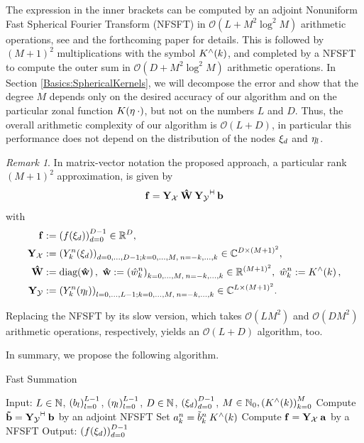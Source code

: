 \documentclass[11pt,a4paper,twoside,bibtotoc]{scrartcl}
\theoremstyle{plain}
\theoremstyle{definition}
\theoremstyle{remark}
\newtheorem{remark}[theorem]{Remark}
\newcommand{\adj}{{\vdash \hspace*{-1.72mm} \dashv}}
\numberwithin{equation}{section}
\numberwithin{table}{section}
\numberwithin{figure}{section}
\begin{document}
The expression in the inner brackets can be computed by an adjoint Nonuniform
Fast Spherical Fourier Transform (NFSFT) in $\mathcal{O}(L + M^2 \log^2 M)$
arithmetic operations, see \cite{} and the forthcoming paper \cite{} for
details.
This is followed by $(M+1)^2$ multiplications with the symbol
$K^{\wedge}{\hspace{-0.4ex}}\left(k\right)$, and completed by a NFSFT to compute the outer sum in
$\mathcal{O}(D + M^2 \log^2 M)$ arithmetic operations.
In Section \ref{Basics:SphericalKernels}, we will decompose the error and show
that the degree $M$ depends only on the desired accuracy of our algorithm and
on the particular zonal function $K{\hspace{-0.4ex}}\left(\mathbf{\eta} \: \cdot\right)$, but not on the
numbers $L$ and $D$.
Thus, the overall arithmetic complexity of our algorithm is $\mathcal{O}(L +
D)$, in particular this performance does not depend on the distribution of the
nodes $\mathbf{\xi}_{d}$ and $\mathbf{\eta}_{l}$.

\begin{remark}
In matrix-vector notation the proposed approach, a particular rank $(M+1)^2$
approximation, is given by
\[
  \V{f} = \V{Y_{\mathcal{X}}} \: \V{\hat W} \:
  \V{Y_{\mathcal{Y}}}^{\adj} \: \V{b}
\]
with
\begin{align}
  \nonumber
  \mathbf{f} & := \left(f{\hspace{-0.4ex}}\left(\mathbf{\xi}_{d}\right)\right)_{d=0}^{D-1} \in \mathbb{R}^D,
  \\ \nonumber
  \mathbf{Y_{\mathcal{X}}} & := \left(Y_k^n{\hspace{-0.4ex}}\left(\mathbf{\xi}_{d}\right)\right)_{d=0,\ldots,D-1;
  k=0,\ldots,M,\:n=-k,\ldots,k} \in \mathbb{C}^{D \times
  \left(M+1\right)^2}, \\ \nonumber
  \mathbf{\hat W} & := \text{\rm{diag}}{\hspace{-0.4ex}}\left(\mathbf{\hat w}\right),\ \mathbf{\hat w} := \left(\hat
  w_{k}^{n}\right)_{k=0,\ldots,M,\:n=-k,\ldots,k} \in \mathbb{R}^{(M+1)^2},\ \hat w_{k}^n :=
  K^{\wedge}{\hspace{-0.4ex}}\left(k\right), \\ \nonumber
  \mathbf{Y_{\mathcal{Y}}} & := \left(Y_k^n{\hspace{-0.4ex}}\left(\mathbf{\eta}_{l}\right)\right)_{l=0,\ldots,L-1;
  k=0,\ldots,M,\:n=-k,\ldots,k} \in \mathbb{C}^{L \times \left(M+1\right)^2}.
\end{align}

Replacing the NFSFT by its slow version, which takes $\mathcal{O}(L M^2)$ and
$\mathcal{O}(D M^2)$ arithmetic operations, respectively, yields an
$\mathcal{O}(L+D)$ algorithm, too.
\end{remark}

In summary, we propose the following algorithm.
\begin{algorithm}[h]
  \caption{Fast Summation}
  \label{Applications:Algorithm:FastSummation}    
  \begin{algorithmic}
    \STATE  Input:  $L \in \mathbb{N}$, $\left(b_{l}\right)_{l=0}^{L-1}$, $\left(\mathbf{\eta}_{l}\right)_{l=0}^{L-1}$, 
                    $D \in \mathbb{N}$, $\left(\mathbf{\xi}_{d}\right)_{d=0}^{D-1}$, $M \in \mathbb{N}_{0}, \left(K^{\wedge}{\hspace{-0.4ex}}\left(k\right)\right)_{k=0}^M$
    \STATE
    \STATE Compute $\V{\tilde{b}}= \V{Y_{\mathcal{Y}}}^{\adj} \: \V{b}$ by an
                    adjoint NFSFT 
    \STATE 
        \STATE Set $a_{k}^n = \tilde{b}_{k}^n \: K^{\wedge}{\hspace{-0.4ex}}\left(k\right)$
      \ENDFOR
    \ENDFOR
    \STATE
    \STATE Compute $\mathbf{f} = \mathbf{Y_{\mathcal{X}}} \: \mathbf{a}$ by a NFSFT
    \STATE
    \STATE Output: $\left(f{\hspace{-0.4ex}}\left(\mathbf{\xi}_{d}\right)\right)_{d=0}^{D-1}$
\end{algorithmic}
\end{algorithm}
\end{document}

